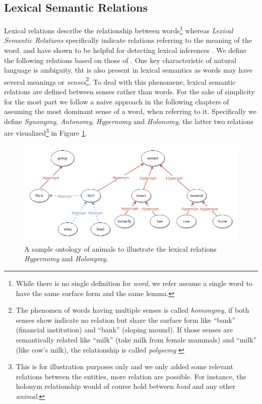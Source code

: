 \subsection{Lexical Semantic Relations}\label{sec:word_relations}
Lexical relations describe the relationship between words\footnote{While there is no single definition for \textit{word}, we refer assume a single word to have the same surface form and the same lemma.} whereas \textit{Lexical Semantic Relations} specifically indicate relations referring to the meaning of the word. \citep{murphy2003semantic} and have shown to be helpful for detecting lexical inferences \citep{dagan2009recognizing}. We define the following relations based on those of \cite{Jurafsky2008May}. One key characteristic of natural language is ambiguity, tht is also present in lexical semantics as words may have several meanings or \textit{senses}\footnote{The phenomen of words having multiple senses is called \textit{homonymy}, if both senses show indicate no relation but share the surface form like ``bank'' (financial institution) and ``bank'' (sloping mound). If those senses are semantically related like ``milk'' (take milk from female mammals) and ``milk'' (like cow's milk), the relationship is called \textit{polysemy} \citep{Jurafsky2008May}}. To deal with this phenomene, lexical semantic relations are defined between senses rather than words. For the sake of simplicity for the most part we follow a naive approach in the following chapters of assuming the most dominant sense of a word, when referring to it. Specifically we define \textit{Synonymy}, \textit{Antonomy}, \textit{Hypernomy} and \textit{Holonomy}, the latter two relations are visualized\footnote{This is for illustration purposes only and we only added some relevant relations between the entities, more relation are possible. For instance, the holonym relationship would of course hold between \textit{head} and any other \textit{animal}.} in Figure \ref{fig:lexical_resources}.
\begin{figure}[tph!]
\centering
	\includegraphics[totalheight=7cm]{fig/lexical_relations.png}
	\caption{A sample ontology of animals to illustrate the lexical relations \textit{Hypernomy} and \textit{Holonymy}.}
	\label{fig:lexical_resources}
\end{figure}

